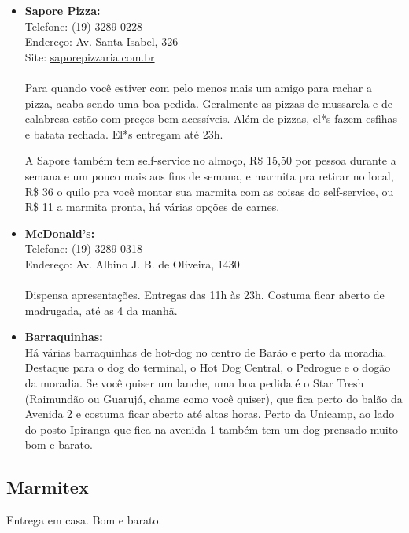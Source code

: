 \begin{itemize}
      \item \textbf{Sapore Pizza:}
        \\Telefone: (19) 3289-0228
        \\Endereço: Av. Santa Isabel, 326
        \\Site: \url{saporepizzaria.com.br}
        \\\\
        Para quando você estiver com pelo menos mais um amigo para rachar a
        pizza, acaba sendo uma boa pedida. Geralmente as pizzas de mussarela e
        de calabresa estão com preços bem acessíveis. Além de pizzas, el*s
        fazem esfihas e batata rechada. El*s entregam até 23h.

        A Sapore também tem self-service no almoço, R\$ 15,50 por pessoa
        durante a semana e um pouco mais aos fins de semana, e marmita pra
        retirar no local, R\$ 36 o quilo pra você montar sua marmita com as
        coisas do self-service, ou R\$ 11 a marmita pronta, há várias opções de
        carnes.

    \item   \textbf{McDonald's:}
        \\Telefone: (19) 3289-0318
        \\Endereço: Av. Albino J. B. de Oliveira, 1430
        \\\\
        Dispensa apresentações. Entregas das 11h às 23h. Costuma ficar aberto
        de madrugada, até as 4 da manhã.

    \item   \textbf{Barraquinhas:}
        \\Há várias barraquinhas de hot-dog no centro de Barão e perto da
        moradia. Destaque para o dog do terminal, o Hot Dog Central, o Pedrogue
        e o dogão da moradia. Se você quiser um lanche, uma boa pedida é o Star
        Tresh (Raimundão ou Guarujá, chame como você quiser), que fica perto do
        balão da Avenida 2 e costuma ficar aberto até altas horas. Perto da
        Unicamp, ao lado do posto Ipiranga que fica na avenida 1 também tem um
        dog prensado muito bom e barato.
\end{itemize}

\subsection{Marmitex}

Entrega em casa. Bom e barato.


